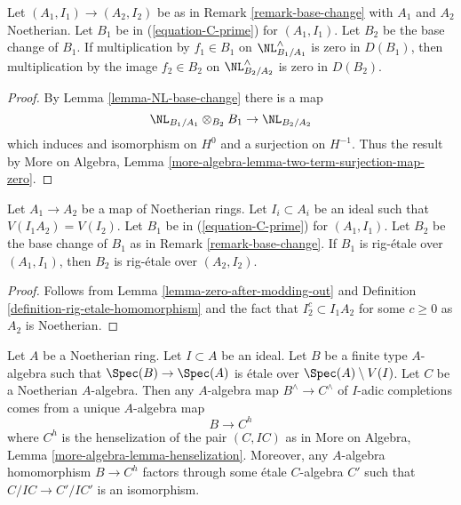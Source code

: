 \begin{lemma}
\label{lemma-zero-after-modding-out}
Let $(A_1, I_1) \to (A_2, I_2)$ be as in
Remark \ref{remark-base-change} with $A_1$ and $A_2$ Noetherian.
Let $B_1$ be in (\ref{equation-C-prime}) for $(A_1, I_1)$.
Let $B_2$ be the base change of $B_1$.
If multiplication by $f_1 \in B_1$ on $\NL^\wedge_{B_1/A_1}$
is zero in $D(B_1)$, then multiplication by
the image $f_2 \in B_2$ on $\NL^\wedge_{B_2/A_2}$ is zero
in $D(B_2)$.
\end{lemma}

\begin{proof}
By Lemma \ref{lemma-NL-base-change} there is a map
$$
\NL_{B_1/A_1} \otimes_{B_2} B_1 \to \NL_{B_2/A_2}
$$
which induces and isomorphism on $H^0$ and a surjection on $H^{-1}$.
Thus the result by
More on Algebra, Lemma \ref{more-algebra-lemma-two-term-surjection-map-zero}.
\end{proof}

\begin{lemma}
\label{lemma-base-change-rig-etale-homomorphism}
Let $A_1 \to A_2$ be a map of Noetherian rings. Let $I_i \subset A_i$
be an ideal such that $V(I_1A_2) = V(I_2)$. Let $B_1$ be in
(\ref{equation-C-prime}) for $(A_1, I_1)$.
Let $B_2$ be the base change of $B_1$ as in
Remark \ref{remark-base-change}.
If $B_1$ is rig-\'etale over $(A_1, I_1)$,
then $B_2$ is rig-\'etale over $(A_2, I_2)$.
\end{lemma}

\begin{proof}
Follows from Lemma \ref{lemma-zero-after-modding-out} and
Definition \ref{definition-rig-etale-homomorphism} and the fact
that $I_2^c \subset I_1A_2$ for some $c \geq 0$ as $A_2$ is Noetherian.
\end{proof}

\begin{lemma}
\label{lemma-fully-faithful-etale-over-complement}
Let $A$ be a Noetherian ring. Let $I \subset A$ be an ideal.
Let $B$ be a finite type $A$-algebra such that
$\Spec(B) \to \Spec(A)$ is \'etale over $\Spec(A) \setminus V(I)$.
Let $C$ be a Noetherian $A$-algebra. Then any $A$-algebra
map $B^\wedge \to C^\wedge$ of $I$-adic completions
comes from a unique $A$-algebra map
$$
B \longrightarrow C^h
$$
where $C^h$ is the henselization of the pair $(C, IC)$ as
in More on Algebra, Lemma \ref{more-algebra-lemma-henselization}.
Moreover, any $A$-algebra homomorphism $B \to C^h$ factors through
some \'etale $C$-algebra $C'$ such that $C/IC \to C'/IC'$ is an isomorphism.
\end{lemma}

